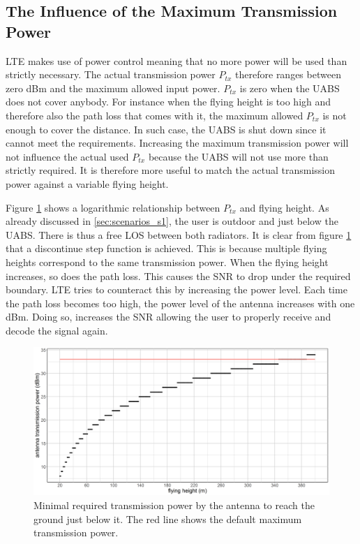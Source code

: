 \subsection{The Influence of the Maximum Transmission Power}
\label{s1a}
\gls{LTE} makes use of power control meaning that no more power will be used than strictly necessary. The actual 
transmission power $P_{tx}$ therefore ranges between zero dBm and the maximum allowed input power. $P_{tx}$ is zero when the \gls{UABS} does not cover anybody.
For instance when the flying height is too high and therefore also the path loss that comes with it, the maximum allowed $P_{tx}$ is not enough to cover 
the distance. In such case, the \gls{UABS} is shut down since it cannot meet the requirements.
Increasing the maximum transmission power will not influence the actual used $P_{tx}$ because the \gls{UABS} will not use more
than strictly required. It is therefore more useful to match the actual transmission power against a variable flying height. 

Figure \ref{fig:ptxfh} shows a logarithmic relationship between $P_{tx}$ and flying height.
As already discussed in \ref{sec:scenarios_s1}, the user is outdoor and just below the \gls{UABS}. There is thus a free \gls{LOS} between both
radiators. It is clear from figure \ref{fig:ptxfh} that a discontinue step function is achieved. This is because multiple flying heights correspond to the same transmission power.
When the flying height increases, so does the path loss. This causes the \gls{SNR} to drop under the required boundary.
 \gls{LTE} tries to counteract this by increasing the power level. Each time 
the path loss becomes too high, the power level of the antenna increases with one dBm. 
Doing so, increases the \gls{SNR} allowing the user to properly receive and decode the signal again.

\begin{figure}[t]
  \centering
  \includegraphics[width=\textwidth]{../results/s1/ptx.png}
  \caption{Minimal required transmission power by the antenna to reach the ground just below it. The red line shows the default maximum transmission power.}
  \label{fig:ptxfh}
\end{figure}

